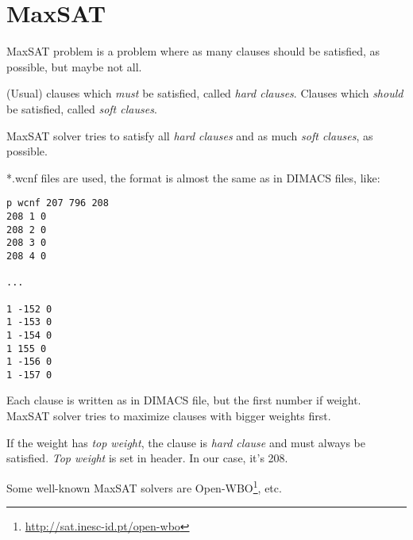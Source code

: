 \section{MaxSAT}

MaxSAT problem is a problem where as many clauses should be satisfied, as possible, but maybe not all.

(Usual) clauses which \textit{must} be satisfied, called \textit{hard clauses}.
Clauses which \textit{should} be satisfied, called \textit{soft clauses}.

MaxSAT solver tries to satisfy all \textit{hard clauses} and as much \textit{soft clauses}, as possible.

*.wcnf files are used, the format is almost the same as in DIMACS files, like:

\begin{lstlisting}
p wcnf 207 796 208
208 1 0
208 2 0
208 3 0
208 4 0

...

1 -152 0
1 -153 0
1 -154 0
1 155 0
1 -156 0
1 -157 0
\end{lstlisting}

Each clause is written as in DIMACS file, but the first number if weight.
MaxSAT solver tries to maximize clauses with bigger weights first.

If the weight has \textit{top weight}, the clause is \textit{hard clause} and must always be satisfied.
\textit{Top weight} is set in header.
In our case, it's 208.

Some well-known MaxSAT solvers are Open-WBO\footnote{\url{http://sat.inesc-id.pt/open-wbo}}, etc.

